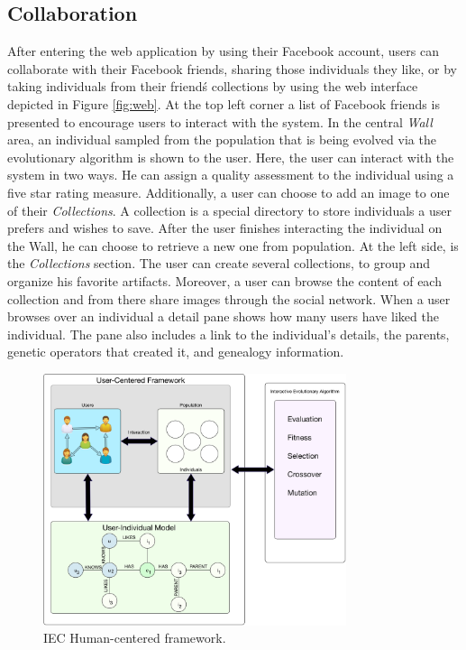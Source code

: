 \documentclass[conference]{IEEEtran}
\begin{document}
\subsection{Collaboration}
\label{sec:col}
After entering the web application by using their Facebook account,
users can collaborate with their Facebook friends, 
sharing those individuals they like, or by taking individuals
from their friend\'s collections by using the web interface depicted 
in Figure \ref{fig:web}.
At the top left corner a list of Facebook friends is presented
to encourage users to interact with the system. In the central 
\emph{ Wall } area, an individual sampled from the population that is
being evolved via the evolutionary algorithm 
is shown to the user.
Here, the user can interact with the system in two ways.
He can assign a quality assessment to the individual using
a five star rating measure.
Additionally, a user can choose to add an image to one of their \emph{Collections}.
A collection is a special directory to store individuals a user prefers and wishes
to save. After the user finishes interacting the individual
on the Wall, he can choose to retrieve a new one from population.
At the left side, is the \emph{Collections} section.
The user can create several collections, to group and organize his favorite 
artifacts. Moreover, a user can browse the content of each collection and from
there share images through the social network.
When a user browses over an individual a detail pane shows how many users have
liked the individual. The pane also includes a link to the individual's 
details, the parents, genetic operators that created it, and genealogy information.

\begin{figure}[!t]
    \centering
        \includegraphics[width=3.5in]{img/framework.png}
    \caption{IEC Human-centered framework.}
    \label{fig:uc_framework}
\end{figure}
\end{document}
